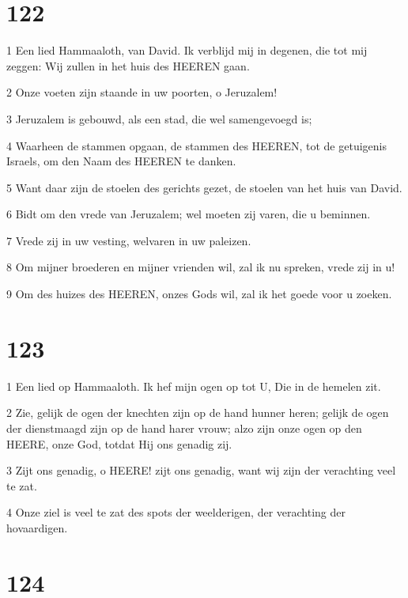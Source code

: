 \chapter{122}

\par 1 Een lied Hammaaloth, van David. Ik verblijd mij in degenen, die tot mij zeggen: Wij zullen in het huis des HEEREN gaan.
\par 2 Onze voeten zijn staande in uw poorten, o Jeruzalem!
\par 3 Jeruzalem is gebouwd, als een stad, die wel samengevoegd is;
\par 4 Waarheen de stammen opgaan, de stammen des HEEREN, tot de getuigenis Israels, om den Naam des HEEREN te danken.
\par 5 Want daar zijn de stoelen des gerichts gezet, de stoelen van het huis van David.
\par 6 Bidt om den vrede van Jeruzalem; wel moeten zij varen, die u beminnen.
\par 7 Vrede zij in uw vesting, welvaren in uw paleizen.
\par 8 Om mijner broederen en mijner vrienden wil, zal ik nu spreken, vrede zij in u!
\par 9 Om des huizes des HEEREN, onzes Gods wil, zal ik het goede voor u zoeken.

\chapter{123}

\par 1 Een lied op Hammaaloth. Ik hef mijn ogen op tot U, Die in de hemelen zit.
\par 2 Zie, gelijk de ogen der knechten zijn op de hand hunner heren; gelijk de ogen der dienstmaagd zijn op de hand harer vrouw; alzo zijn onze ogen op den HEERE, onze God, totdat Hij ons genadig zij.
\par 3 Zijt ons genadig, o HEERE! zijt ons genadig, want wij zijn der verachting veel te zat.
\par 4 Onze ziel is veel te zat des spots der weelderigen, der verachting der hovaardigen.

\chapter{124}


